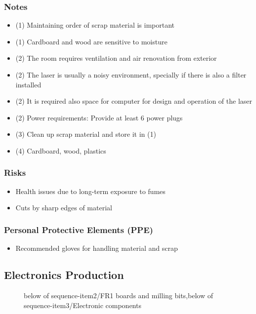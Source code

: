 \documentclass[a4paper,12pt,titlepage]{article}
\begin{document}
\subsubsection*{Notes}
\begin{itemize}
\item (1) Maintaining order of scrap material is important
\item (1) Cardboard and wood are sensitive to moisture
\item (2) The room requires ventilation and air renovation from exterior
\item (2) The laser is usually a noisy environment, specially if there is also a filter installed
\item (2) It is required also space for computer for design and operation of the laser
\item (2) Power requirements: Provide at least 6 power plugs
\item (3) Clean up scrap material and store it in (1)
\item (4) Cardboard, wood, plastics
\end{itemize}
\subsubsection*{Risks}
\begin{itemize}
\item Health issues due to long-term exposure to fumes 
\item Cuts by sharp edges of material
\end{itemize}
\subsubsection*{Personal Protective Elements (PPE)}
\begin{itemize}
\item Recommended gloves for handling material and scrap
\end{itemize}
\clearpage


\subsection{Electronics Production}
\begin{figure}[h]
\centering
{}
{below of sequence-item2/{FR1 boards and milling bits},below of sequence-item3/Electronic components}
\vspace{1cm}
\end{figure}
\end{document}
